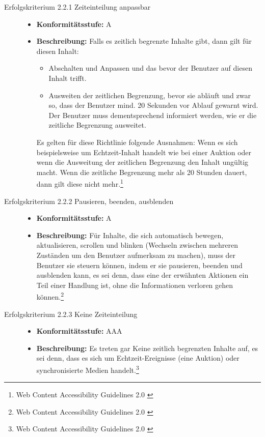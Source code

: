 \begin{description}
	\begin{description}
		\item[Erfolgskriterium 2.2.1 Zeiteinteilung anpassbar]\hfill
		\begin{itemize}
			\item \textbf{Konformitätsstufe:} A
			\item \textbf{Beschreibung:} Falls es zeitlich begrenzte Inhalte gibt, dann gilt für diesen Inhalt:
			\begin{itemize}
				\item Abschalten und Anpassen und das bevor der Benutzer auf diesen Inhalt trifft.
				\item Ausweiten der zeitlichen Begrenzung, bevor sie abläuft und zwar so, dass der Benutzer mind. 20 Sekunden vor Ablauf gewarnt wird. Der Benutzer muss 
				dementsprechend informiert werden, wie er die zeitliche Begrenzung ausweitet.
			\end{itemize}
			Es gelten für diese Richtlinie folgende Ausnahmen: Wenn es sich beispielsweise um Echtzeit-Inhalt handelt wie bei einer Auktion oder wenn die Ausweitung 
			der zeitlichen Begrenzung den Inhalt ungültig macht. Wenn die zeitliche Begrenzung mehr als 20 Stunden dauert, dann gilt diese nicht 
			mehr.\footnote{Web Content Accessibility Guidelines 2.0 \cite{WCAG2.0}}
		\end{itemize}
		
		\item[Erfolgskriterium 2.2.2 Pausieren, beenden, ausblenden]\hfill
		\begin{itemize}
			\item \textbf{Konformitätsstufe:} A
			\item \textbf{Beschreibung:} Für Inhalte, die sich automatisch bewegen, aktualisieren, scrollen und blinken (Wechseln zwischen mehreren Zuständen um den 
			Benutzer aufmerksam zu machen), muss der Benutzer sie steuern können, indem er sie pausieren, beenden und ausblenden kann, es sei denn, dass eine der 
			erwähnten Aktionen ein Teil einer Handlung ist, ohne die Informationen verloren gehen können.\footnote{Web Content Accessibility Guidelines 2.0 \cite{WCAG2.0}}
		\end{itemize}
		
		\item[Erfolgskriterium 2.2.3 Keine Zeiteinteilung]\hfill
		\begin{itemize}
			\item \textbf{Konformitätsstufe:} AAA
			\item \textbf{Beschreibung:} Es treten gar Keine zeitlich begrenzten Inhalte auf, es sei denn, dass es sich um Echtzeit-Ereignisse (eine Auktion) oder  
			synchronisierte Medien handelt.\footnote{Web Content Accessibility Guidelines 2.0 \cite{WCAG2.0}}
		\end{itemize}
		

\end{description}
\end{description}
